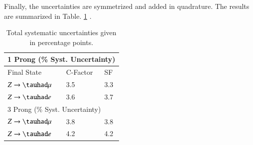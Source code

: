 Finally, the uncertainties are symmetrized and added in quadrature. The results are summarized in Table. \ref{totalsys} .
\begin{table}[]
	\centering
	\begin{tabular}{|lll|}
		\hline
		\multicolumn{3}{|l|}{1 Prong (\% Syst. Uncertainty)}                         \\ \hline
		\multicolumn{1}{|l|}{Final State}      & \multicolumn{1}{l|}{C-Factor} & SF  \\ \hline
		\multicolumn{1}{|l|}{$Z\to\tauhad\mu$} & \multicolumn{1}{l|}{3.5}      & 3.3 \\ \hline
		\multicolumn{1}{|l|}{$Z\to\tauhad e$}  & \multicolumn{1}{l|}{3.6}      & 3.7 \\ \hline
		\multicolumn{3}{|l|}{3 Prong (\% Syst. Uncertainty)}                         \\ \hline
		\multicolumn{1}{|l|}{$Z\to\tauhad\mu$} & \multicolumn{1}{l|}{3.8}      & 3.8 \\ \hline
		\multicolumn{1}{|l|}{$Z\to\tauhad e$}  & \multicolumn{1}{l|}{4.2}      & 4.2 \\ \hline
	\end{tabular}
	\caption{Total systematic uncertainties given in percentage points.}
	\label{totalsys}
\end{table}